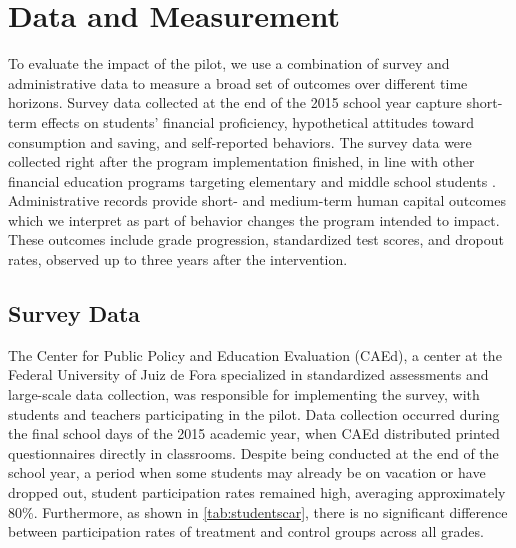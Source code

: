 \section{Data and Measurement} \label{sec:data_c}

To evaluate the impact of the pilot, we use a combination of survey and administrative data to measure a broad set of outcomes over different time horizons. Survey data collected at the end of the 2015 school year capture short-term effects on students’ financial proficiency, hypothetical attitudes toward consumption and saving, and self-reported behaviors. The survey data were collected right after the program implementation finished, in line with other financial education programs targeting elementary and middle school students \citep{de2021effect, batty2020experiential, berry2018impact}. Administrative records provide short- and medium-term human capital outcomes which we interpret as part of behavior changes the program intended to impact. These outcomes include grade progression, standardized test scores, and dropout rates, observed up to three years after the intervention.


\subsection{Survey Data} \label{subsec:question}

The Center for Public Policy and Education Evaluation (CAEd), a center at the Federal University of Juiz de Fora specialized in standardized assessments and large-scale data collection, was responsible for implementing the survey, with students and teachers participating in the pilot. Data collection occurred during the final school days of the 2015 academic year, when CAEd distributed printed questionnaires directly in classrooms. Despite being conducted at the end of the school year, a period when some students may already be on vacation or have dropped out, student participation rates remained high, averaging approximately 80\%. Furthermore, as shown in \autoref{tab:studentscar}, there is no significant difference between participation rates of treatment and control groups across all grades.


